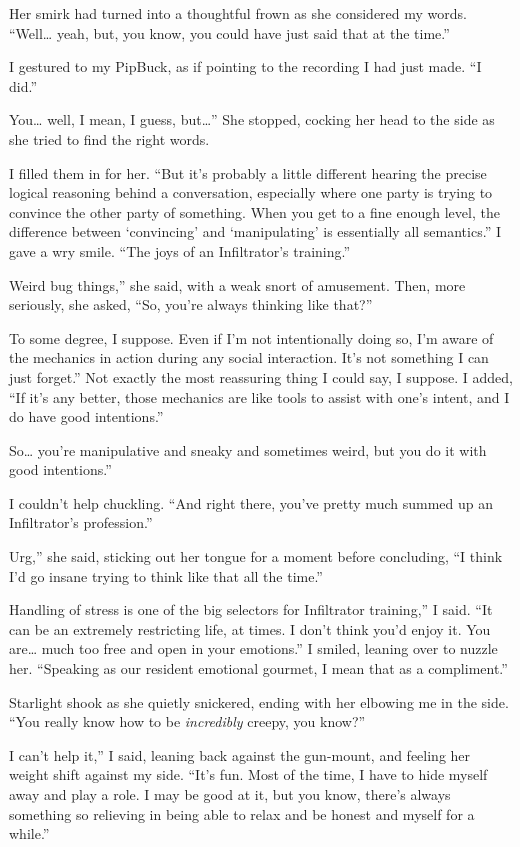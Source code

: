 Her smirk had turned into a thoughtful frown as she considered my words. “Well… yeah, but, you know, you could have just said that at the time.”

I gestured to my PipBuck, as if pointing to the recording I had just made. “I did.”

\leavevmode{}You… well, I mean, I guess, but…” She stopped, cocking her head to the side as she tried to find the right words.

I filled them in for her. “But it’s probably a little different hearing the precise logical reasoning behind a conversation, especially where one party is trying to convince the other party of something. When you get to a fine enough level, the difference between ‘convincing’ and ‘manipulating’ is essentially all semantics.” I gave a wry smile. “The joys of an Infiltrator’s training.”

\leavevmode{}Weird bug things,” she said, with a weak snort of amusement. Then, more seriously, she asked, “So, you’re always thinking like that?”

\leavevmode{}To some degree, I suppose. Even if I’m not intentionally doing so, I’m aware of the mechanics in action during any social interaction. It’s not something I can just forget.” Not exactly the most reassuring thing I could say, I suppose. I added, “If it’s any better, those mechanics are like tools to assist with one’s intent, and I do have good intentions.”

\leavevmode{}So… you’re manipulative and sneaky and sometimes weird, but you do it with good intentions.”

I couldn’t help chuckling. “And right there, you’ve pretty much summed up an Infiltrator’s profession.”

\leavevmode{}Urg,” she said, sticking out her tongue for a moment before concluding, “I think I’d go insane trying to think like that all the time.”

\leavevmode{}Handling of stress is one of the big selectors for Infiltrator training,” I said. “It can be an extremely restricting life, at times. I don’t think you’d enjoy it. You are… much too free and open in your emotions.” I smiled, leaning over to nuzzle her. “Speaking as our resident emotional gourmet, I mean that as a compliment.”

Starlight shook as she quietly snickered, ending with her elbowing me in the side. “You really know how to be \textit{incredibly} creepy, you know?”

\leavevmode{}I can’t help it,” I said, leaning back against the gun-mount, and feeling her weight shift against my side. “It’s fun. Most of the time, I have to hide myself away and play a role. I may be good at it, but you know, there’s always something so relieving in being able to relax and be honest and myself for a while.”

